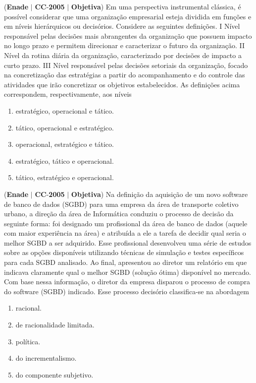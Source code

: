 \documentclass{exam}
\begin{document}
\begin{questions}
\question (\textbf{Enade} $|$ \textbf{CC}-\textbf{2005} $|$ \textbf{Objetiva})
Em uma perspectiva instrumental clássica, é possível considerar
que uma organização empresarial esteja dividida em funções e em
níveis hierárquicos ou decisórios. Considere as seguintes
definições.
I Nível responsável pelas decisões mais abrangentes da
organização que possuem impacto no longo prazo e permitem
direcionar e caracterizar o futuro da organização.
II Nível da rotina diária da organização, caracterizado por
decisões de impacto a curto prazo.
III Nível responsável pelas decisões setoriais da organização,
focado na concretização das estratégias a partir do
acompanhamento e do controle das atividades que irão
concretizar os objetivos estabelecidos.
As definições acima correspondem, respectivamente, aos níveis
	\begin{enumerate}[label=\alph*)]
		\item  estratégico, operacional e tático.
		\item  tático, operacional e estratégico.
		\item  operacional, estratégico e tático.
		\item  estratégico, tático e operacional.
		\item  tático, estratégico e operacional.
	\end{enumerate}

\question (\textbf{Enade} $|$ \textbf{CC}-\textbf{2005} $|$ \textbf{Objetiva})
Na definição da aquisição de um novo software de
banco de dados (SGBD) para uma empresa da área de
transporte coletivo urbano, a direção da área de Informática
conduziu o processo de decisão da seguinte forma: foi
designado um profissional da área de banco de dados (aquele
com maior experiência na área) e atribuída a ele a tarefa de
decidir qual seria o melhor SGBD a ser adquirido. Esse
profissional desenvolveu uma série de estudos sobre as opções
disponíveis utilizando técnicas de simulação e testes específicos
para cada SGBD analisado. Ao final, apresentou ao diretor
um relatório em que indicava claramente qual o melhor SGBD
(solução ótima) disponível no mercado. Com base nessa
informação, o diretor da empresa disparou o processo de
compra do software (SGBD) indicado.
Esse processo decisório classifica-se na abordagem
	\begin{enumerate}[label=\alph*)]
		\item  racional.
		\item  de racionalidade limitada.
		\item  política.
		\item  do incrementalismo.
		\item  do componente subjetivo.
	\end{enumerate}


\end{questions}
\end{document}
